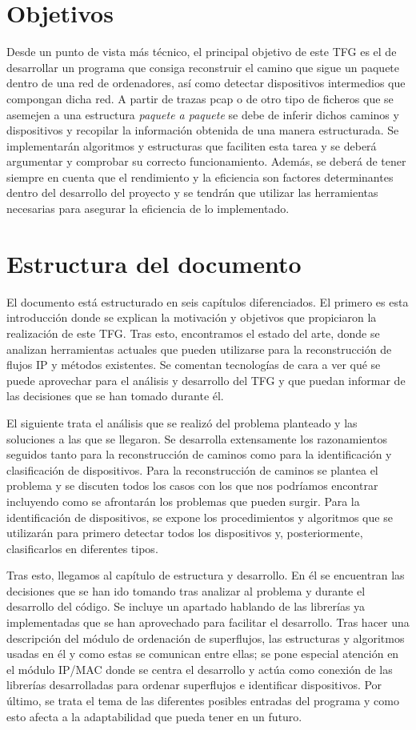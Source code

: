 \documentclass[twoside, 12pt]{epstfg}
\begin{document}
\section{Objetivos}
Desde un punto de vista más técnico, el principal objetivo de este TFG es el de desarrollar un programa que consiga reconstruir el camino que sigue un paquete dentro de una red de ordenadores, así como detectar dispositivos intermedios que compongan dicha red. A partir de trazas pcap o de otro tipo de ficheros que se asemejen a una estructura \textit{paquete a paquete} se debe de inferir dichos caminos y dispositivos y recopilar la información obtenida de una manera estructurada. Se implementarán algoritmos y estructuras que faciliten esta tarea y se deberá argumentar y comprobar su correcto funcionamiento. Además, se deberá de tener siempre en cuenta que el rendimiento y la eficiencia son factores determinantes dentro del desarrollo del proyecto y se tendrán que utilizar las herramientas necesarias para asegurar la eficiencia de lo implementado.

\section{Estructura del documento}
El documento está estructurado en seis capítulos diferenciados. El primero es esta introducción donde se explican la motivación y objetivos que propiciaron la realización de este TFG. Tras esto, encontramos el estado del arte, donde se analizan herramientas actuales que pueden utilizarse para la reconstrucción de flujos IP y métodos existentes. Se comentan tecnologías de cara a ver qué se puede aprovechar para el análisis y desarrollo del TFG y que puedan informar de las decisiones que se han tomado durante él.

El siguiente trata el análisis que se realizó del problema planteado y las soluciones a las que se llegaron. Se desarrolla extensamente los razonamientos seguidos tanto para la reconstrucción de caminos como para la identificación y clasificación de dispositivos. Para la reconstrucción de caminos se plantea el problema y se discuten todos los casos con los que nos podríamos encontrar incluyendo como se afrontarán los problemas que pueden surgir. Para la identificación de dispositivos, se expone los procedimientos y algoritmos que se utilizarán para primero detectar todos los dispositivos y, posteriormente, clasificarlos en diferentes tipos.

Tras esto, llegamos al capítulo de estructura y desarrollo. En él se encuentran las decisiones que se han ido tomando tras analizar al problema y durante el desarrollo del código. Se incluye un apartado hablando de las librerías ya implementadas que se han aprovechado para facilitar el desarrollo. Tras hacer una descripción del módulo de ordenación de superflujos, las estructuras y algoritmos usadas en él y como estas se comunican entre ellas; se pone especial atención en el módulo IP/MAC donde se centra el desarrollo y actúa como conexión de las librerías desarrolladas para ordenar superflujos e identificar dispositivos. Por último, se trata el tema de las diferentes posibles entradas del programa y como esto afecta a la adaptabilidad que pueda tener en un futuro.
\end{document}
